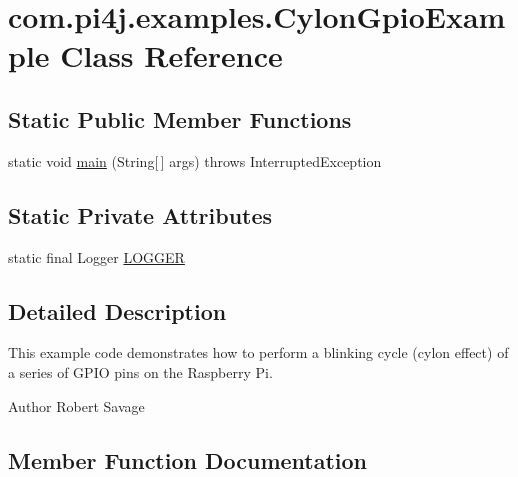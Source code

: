 \hypertarget{classcom_1_1pi4j_1_1examples_1_1CylonGpioExample}{}\section{com.\+pi4j.\+examples.\+Cylon\+Gpio\+Example Class Reference}
\label{classcom_1_1pi4j_1_1examples_1_1CylonGpioExample}
\subsection*{Static Public Member Functions}
\begin{DoxyCompactItemize}
\item 
static void \hyperlink{classcom_1_1pi4j_1_1examples_1_1CylonGpioExample_ae80a9ff473477226b3ab65ce1ed2f07c}{main} (String\mbox{[}$\,$\mbox{]} args)  throws Interrupted\+Exception 
\end{DoxyCompactItemize}
\subsection*{Static Private Attributes}
\begin{DoxyCompactItemize}
\item 
static final Logger \hyperlink{classcom_1_1pi4j_1_1examples_1_1CylonGpioExample_ab722f91cd495fe3d6ce3ffbd93c901cd}{L\+O\+G\+G\+E\+R}
\end{DoxyCompactItemize}


\subsection{Detailed Description}
This example code demonstrates how to perform a blinking cycle (cylon effect) of a series of G\+P\+I\+O pins on the Raspberry Pi.

\begin{DoxyAuthor}{Author}
Robert Savage 
\end{DoxyAuthor}


\subsection{Member Function Documentation}
\hypertarget{classcom_1_1pi4j_1_1examples_1_1CylonGpioExample_ae80a9ff473477226b3ab65ce1ed2f07c}{}
